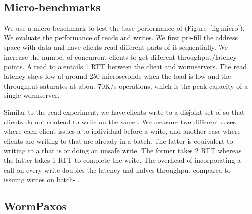 \subsection{Micro-benchmarks}


We use a micro-benchmark to test the base performance of \sysname{} (Figure~\ref{fig:micro}). We evaluate the performance of reads and writes. We first pre-fill the address space with data and have clients read different parts of it sequentially. We increase the number of concurrent clients to get different throughput/latency points. A read to a \WOR{} entails 1 RTT between the client and wormservers. The read latency stays low at around 250 microseconds when the load is low and the throughput saturates at about 70K/s operations, which is the peak capacity of a single wormserver.

Similar to the read experiment, we have clients write to a disjoint set of \WORs{} so that clients do not contend to write on the same \WOR{}. We measure two different cases where each client issues a \prepare{} to individual \WORs{} before a write, and another case where clients are writing to \WORs{} that are already \prepared{} in a batch. The latter is equivalent to writing to a \WOS{} that is \prepared{} or doing an unsafe write. The former takes 2 RTT whereas the latter takes 1 RTT to complete the write. 
The overhead of incorporating a \prepare{} call on every write doubles the latency and halves throughput compared to issuing writes on batch-\prepared{} \WORs{}. 

 
 
\subsection{WormPaxos}

